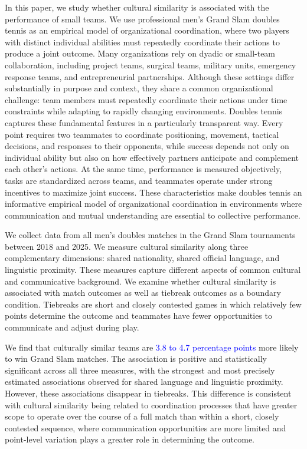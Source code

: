 \documentclass[10pt]{article}
\begin{document}
In this paper, we study whether cultural similarity is associated with the performance of small teams. We use professional men's Grand Slam doubles tennis as an empirical model of organizational coordination, where two players with distinct individual abilities must repeatedly coordinate their actions to produce a joint outcome.  Many organizations rely on dyadic or small-team collaboration, including project teams, surgical teams, military units, emergency response teams, and entrepreneurial partnerships. Although these settings differ substantially in purpose and context, they share a common organizational challenge: team members must repeatedly coordinate their actions under time constraints while adapting to rapidly changing environments. Doubles tennis captures these fundamental features in a particularly transparent way. Every point requires two teammates to coordinate positioning, movement, tactical decisions, and responses to their opponents, while success depends not only on individual ability but also on how effectively partners anticipate and complement each other's actions. At the same time, performance is measured objectively, tasks are standardized across teams, and teammates operate under strong incentives to maximize joint success. These characteristics make doubles tennis an informative empirical model of organizational coordination in environments where communication and mutual understanding are essential to collective performance.

We collect data from all men's doubles matches in the Grand Slam tournaments between 2018 and 2025. We measure cultural similarity along three complementary dimensions: shared nationality, shared official language, and linguistic proximity. These measures capture different aspects of common cultural and communicative background. We examine whether cultural similarity is associated with match outcomes as well as tiebreak outcomes as a boundary condition. Tiebreaks are short and closely contested games in which relatively few points determine the outcome and teammates have fewer opportunities to communicate and adjust during play.

We find that culturally similar teams are \textcolor{blue}{3.8 to 4.7 percentage points} more likely to win Grand Slam matches. The association is positive and statistically significant across all three measures, with the strongest and most precisely estimated associations observed for shared language and linguistic proximity. However, these associations disappear in
tiebreaks.  This difference is consistent with cultural similarity being related to coordination processes that have greater scope to operate over the course of a full match than within a short, closely contested sequence, where communication opportunities are more limited and point-level variation plays a greater role in determining the outcome. 
\end{document}
